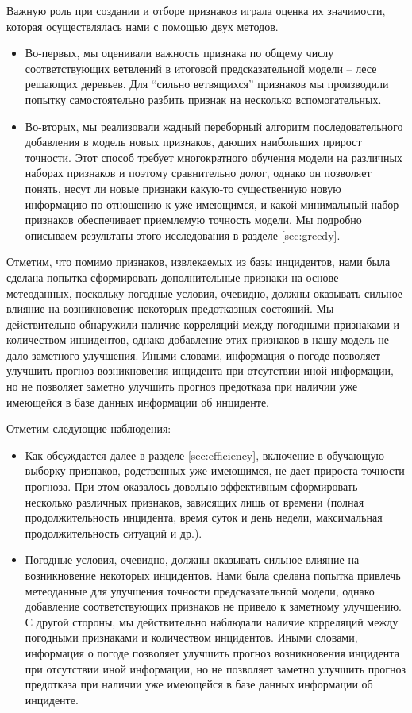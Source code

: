 Важную роль при создании и отборе признаков играла оценка их значимости, которая осуществлялась нами с помощью двух методов. 
\begin{itemize}
\item
Во-первых, мы оценивали важность признака по общему числу соответствующих ветвлений в итоговой предсказательной модели -- лесе решающих деревьев. Для ``сильно ветвящихся'' признаков мы производили попытку самостоятельно разбить признак на несколько вспомогательных. 
\item Во-вторых, мы реализовали жадный переборный алгоритм последовательного добавления в модель новых признаков, дающих наибольших прирост точности. Этот способ требует многократного обучения модели на различных наборах признаков и поэтому сравнительно долог, однако он позволяет понять, несут ли новые признаки какую-то существенную новую информацию по отношению к уже имеющимся, и какой минимальный набор признаков обеспечивает приемлемую точность модели. Мы подробно описываем результаты этого исследования в разделе \ref{sec:greedy}.
\end{itemize}
Отметим, что помимо признаков, извлекаемых из базы инцидентов, нами была сделана попытка сформировать дополнительные признаки на основе метеоданных, поскольку погодные условия, очевидно, должны оказывать сильное влияние на возникновение некоторых предотказных состояний. Мы действительно обнаружили наличие корреляций между погодными признаками и количеством инцидентов, однако добавление этих признаков в нашу модель не дало заметного улучшения. Иными словами, информация о погоде позволяет улучшить прогноз возникновения инцидента при отсутствии иной информации, но не позволяет заметно улучшить прогноз предотказа при наличии уже имеющейся в базе данных информации об инциденте.


Отметим следующие наблюдения:
\begin{itemize}
\item Как обсуждается далее в разделе \ref{sec:efficiency}, включение в обучающую выборку признаков, родственных уже имеющимся, не дает прироста точности прогноза.
При этом оказалось довольно эффективным сформировать несколько различных признаков, зависящих лишь от времени (полная продолжительность инцидента, время суток и день недели, максимальная продолжительность ситуаций и др.).
\item Погодные условия, очевидно, должны оказывать сильное влияние на возникновение некоторых инцидентов. Нами была сделана попытка привлечь метеоданные для улучшения точности предсказательной модели, однако добавление соответствующих признаков не привело к заметному улучшению. С другой стороны, мы действительно наблюдали наличие корреляций между погодными признаками и количеством инцидентов. Иными словами, информация о погоде позволяет улучшить прогноз возникновения инцидента при отсутствии иной информации, но не позволяет заметно улучшить прогноз предотказа при наличии уже имеющейся в базе данных информации об инциденте.  
\end{itemize}


